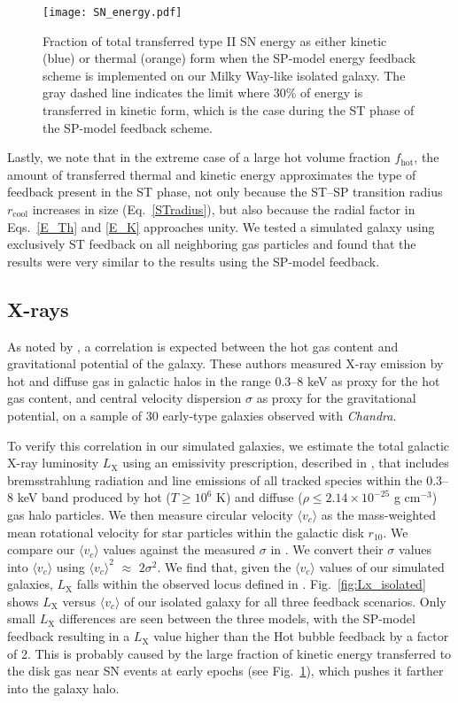 \documentclass[iop]{emulateapj}
\begin{document}
\begin{figure}
\texttt{[image: SN\_energy.pdf]}
\caption{Fraction of total transferred type II SN energy as either kinetic (blue) or thermal (orange) form when the SP-model energy feedback scheme is implemented on our Milky Way-like isolated galaxy. The gray dashed line indicates the limit where 30\% of energy is transferred in kinetic form, which is the case during the ST phase of the SP-model feedback scheme.}
\label{fig:diag_isolated_K-Th_sp}
\end{figure}

Lastly, we note that in the extreme case of a large hot volume fraction $f_{\mathrm{hot}}$, the amount of transferred thermal and kinetic energy approximates the type of feedback present in the ST phase, not only because the ST--SP transition radius $r_{\mathrm{cool}}$ increases in size (Eq.~\ref{STradius}), but also because the radial factor in Eqs.~\ref{E_Th} and \ref{E_K} approaches unity. We tested a simulated galaxy using exclusively ST feedback on all neighboring gas particles and found that the results were very similar to the results using the SP-model feedback.

\subsection{X-rays}\label{subsec:res_Xrays}
As noted by \citet{Boroson11}, a correlation is expected between the hot gas content and gravitational potential of the galaxy. These authors measured X-ray emission by hot and diffuse gas in galactic halos in the range 0.3--8 keV as proxy for the hot gas content, and central velocity dispersion $\sigma$ as proxy for the gravitational potential, on a sample of 30 early-type galaxies observed with \textit{Chandra}.

To verify this correlation in our simulated galaxies, we estimate the total galactic X-ray luminosity $L_{\mathrm{X}}$ using an emissivity prescription, described in \citet{Choi14}, that includes bremsstrahlung radiation and line emissions of all tracked species within the 0.3--8 keV band produced by hot ($T \ge 10^6$ K) and diffuse ($\rho \le 2.14\times 10^{-25}$ g cm$^{-3}$) gas halo particles. We then measure circular velocity $\langle v_c \rangle$ as the mass-weighted mean rotational velocity for star particles within the galactic disk $r_{10}$. We compare our $\langle v_c \rangle$ values against the measured $\sigma$ in \citet{Boroson11}. We convert their $\sigma$ values into $\langle v_c \rangle$ using $\langle v_c \rangle^2$ $\approx$ $2\sigma^2$. We find that, given the $\langle v_c \rangle$ values of our simulated galaxies, $L_{\mathrm{X}}$ falls within the observed locus defined in \citet{Boroson11}. Fig.~\ref{fig:Lx_isolated} shows $L_{\mathrm{X}}$ versus $\langle v_c \rangle$ of our isolated galaxy for all three feedback scenarios. Only small $L_{\mathrm{X}}$ differences are seen between the three models, with the SP-model feedback resulting in a $L_{\mathrm{X}}$ value higher than the Hot bubble feedback by a factor of 2. This is probably caused by the large fraction of kinetic energy transferred to the disk gas near SN events at early epochs (see Fig.~\ref{fig:diag_isolated_K-Th_sp}), which pushes it farther into the galaxy halo.
\end{document}
